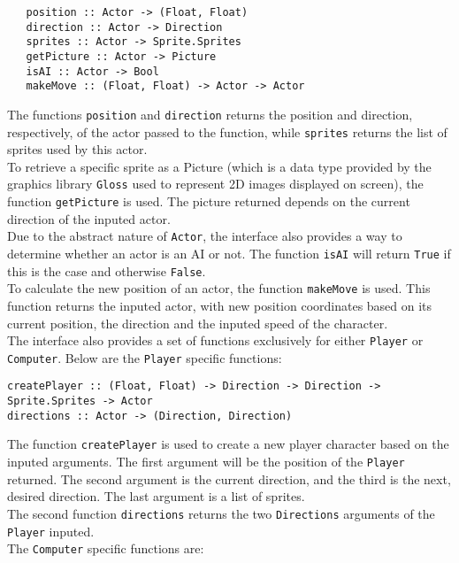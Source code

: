 \documentclass{article}
\begin{document}
   \begin{verbatim}
   position :: Actor -> (Float, Float)
   direction :: Actor -> Direction
   sprites :: Actor -> Sprite.Sprites
   getPicture :: Actor -> Picture
   isAI :: Actor -> Bool
   makeMove :: (Float, Float) -> Actor -> Actor
   \end{verbatim}

		\noindent The functions \texttt{position} and \texttt{direction} returns the position and 	direction, respectively, of the actor passed to the function, while \texttt{sprites} returns the list of sprites used by this actor. \\
    	\newline
        To retrieve a specific sprite as a Picture (which is a data type provided by the graphics library \texttt{Gloss} used to represent 2D images displayed on screen), the function \texttt{getPicture} is used. The picture returned depends on the current direction of the inputed actor. \\
    	\newline
    	Due to the abstract nature of \texttt{Actor}, the interface also provides a way to determine whether an actor is an AI or not. The function \texttt{isAI} will return \texttt{True} if this is the case and otherwise \texttt{False}. \\
	    \newline
    	To calculate the new position of an actor, the function \texttt{makeMove} is used. This function returns the inputed actor, with new position coordinates based on its current position, the direction and the inputed speed of the character.\\
    	\newline
    	The interface also provides a set of functions exclusively for either \texttt{Player} or \texttt{Computer}. Below are the \texttt{Player} specific functions: \\

   \begin{verbatim}
createPlayer :: (Float, Float) -> Direction -> Direction -> Sprite.Sprites -> Actor
directions :: Actor -> (Direction, Direction)
   \end{verbatim}

    	\noindent The function \texttt{createPlayer} is used to create a new player character based on the inputed arguments. The first argument will be the position of the \texttt{Player} returned. The second argument is the current direction, and the third is the next, desired direction. The last argument is a list of sprites. \\
    	\newline
    	The second function \texttt{directions} returns the two \texttt{Directions} arguments of the \texttt{Player} inputed. \\
    	\newline
    	The \texttt{Computer} specific functions are: \\
\end{document}
